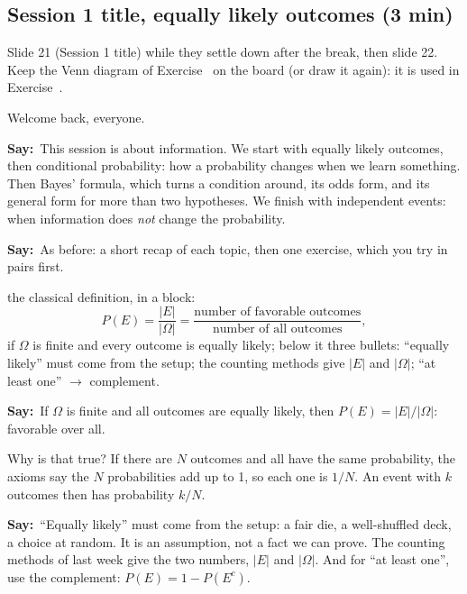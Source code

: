 \documentclass[11pt,a4paper,parskip=half]{scrartcl}
\newcommand{\Om}{\Omega}
\newcommand{\say}{\textbf{\color{teal}Say:}\ }
\begin{document}
\subsection{Session 1 title, equally likely outcomes (3 min)}

\begin{printskip}
	\begin{slidecue}
		Slide 21 (Session 1 title) while they settle down after the break,
		then slide 22. Keep the Venn diagram of Exercise~
		on the board (or draw it again): it is used in
		Exercise~.
	\end{slidecue}

	Welcome back, everyone.

	\say This session is about information. We start with equally likely
	outcomes, then conditional probability: how a probability changes when
	we learn something. Then Bayes' formula, which turns a condition
	around, its odds form, and its general form for more than two
	hypotheses. We finish with independent events: when information does
	\emph{not} change the probability.

	\say As before: a short recap of each topic, then one exercise, which
	you try in pairs first.
\end{printskip}

\begin{onslide}
	the classical definition, in a block:
	\[ P(E)=\frac{|E|}{|\Om|}=\frac{\text{number of favorable outcomes}}
		{\text{number of all outcomes}}, \]
	if $\Om$ is finite and every outcome is equally likely; below it three
	bullets: ``equally likely'' must come from the setup; the counting
	methods give $|E|$ and $|\Om|$; ``at least one'' $\to$ complement.
\end{onslide}

\say If $\Om$ is finite and all outcomes are equally likely, then
$P(E)=|E|/|\Om|$: favorable over all.

Why is that true? If there are $N$ outcomes and all have the same
probability, the axioms say the $N$ probabilities add up to 1, so each one
is $1/N$. An event with $k$ outcomes then has probability $k/N$.

\say ``Equally likely'' must come from the setup: a fair die, a
well-shuffled deck, a choice at random. It is an assumption, not a fact we
can prove. The counting methods of last week give the two numbers, $|E|$
and $|\Om|$. And for ``at least one'', use the complement:
$P(E)=1-P(E^c)$.
\end{document}
